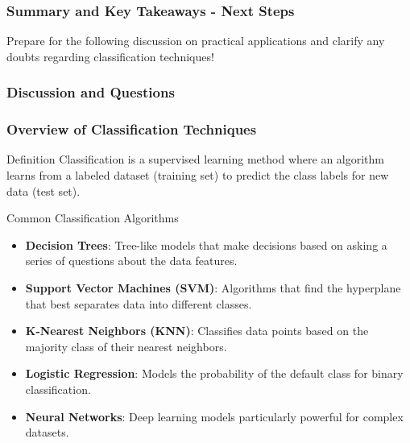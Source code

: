 \documentclass[aspectratio=169]{beamer}
\begin{document}
\begin{frame}[fragile]
    \frametitle{Summary and Key Takeaways - Next Steps}
    Prepare for the following discussion on practical applications and clarify any doubts regarding classification techniques!
\end{frame}

\begin{frame}[fragile]
  \frametitle{Discussion and Questions}
\end{frame}

\begin{frame}[fragile]
  \frametitle{Overview of Classification Techniques}
  \begin{block}{Definition}
    Classification is a supervised learning method where an algorithm learns from a labeled dataset (training set) to predict the class labels for new data (test set).
  \end{block}

  \begin{block}{Common Classification Algorithms}
    \begin{itemize}
      \item \textbf{Decision Trees}: Tree-like models that make decisions based on asking a series of questions about the data features.
      \item \textbf{Support Vector Machines (SVM)}: Algorithms that find the hyperplane that best separates data into different classes.
      \item \textbf{K-Nearest Neighbors (KNN)}: Classifies data points based on the majority class of their nearest neighbors.
      \item \textbf{Logistic Regression}: Models the probability of the default class for binary classification.
      \item \textbf{Neural Networks}: Deep learning models particularly powerful for complex datasets.
    \end{itemize}
  \end{block}
\end{frame}
\end{document}
